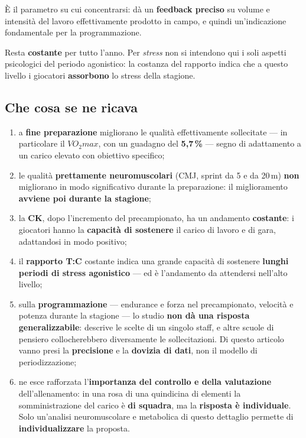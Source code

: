 È il parametro su cui concentrarsi: dà un \textbf{feedback preciso} su volume e intensità del
lavoro effettivamente prodotto in campo, e quindi un'indicazione fondamentale per la
programmazione.

Resta \textbf{costante} per tutto l'anno. Per \textit{stress} non si intendono qui i soli aspetti
psicologici del periodo agonistico: la costanza del rapporto indica che a questo livello i
giocatori \textbf{assorbono} lo stress della stagione.

\subsection{Che cosa se ne ricava}

\begin{enumerate}
  \item a \textbf{fine preparazione} migliorano le qualità effettivamente sollecitate --- in
    particolare il \textbf{$VO_2max$}, con un guadagno del \textbf{5,7\,\%} --- segno di
    adattamento a un carico elevato con obiettivo specifico;
  \item le qualità \textbf{prettamente neuromuscolari} (CMJ, sprint da 5 e da 20\,m)
    \textbf{non} migliorano in modo significativo durante la preparazione: il miglioramento
    \textbf{avviene poi durante la stagione};
  \item la \textbf{CK}, dopo l'incremento del precampionato, ha un andamento \textbf{costante}:
    i giocatori hanno la \textbf{capacità di sostenere} il carico di lavoro e di gara,
    adattandosi in modo positivo;
  \item il \textbf{rapporto T:C} costante indica una grande capacità di sostenere \textbf{lunghi
    periodi di stress agonistico} --- ed è l'andamento da attendersi nell'alto livello;
  \item sulla \textbf{programmazione} --- endurance e forza nel precampionato, velocità e potenza
    durante la stagione --- lo studio \textbf{non dà una risposta generalizzabile}: descrive le
    scelte di un singolo staff, e altre scuole di pensiero collocherebbero diversamente le
    sollecitazioni. Di questo articolo vanno presi la \textbf{precisione} e la
    \textbf{dovizia di dati}, non il modello di periodizzazione;
  \item ne esce rafforzata l'\textbf{importanza del controllo e della valutazione}
    dell'allenamento: in una rosa di una quindicina di elementi la somministrazione del carico è
    \textbf{di squadra}, ma la \textbf{risposta è individuale}. Solo un'analisi neuromuscolare e
    metabolica di questo dettaglio permette di \textbf{individualizzare} la proposta.
\end{enumerate}

